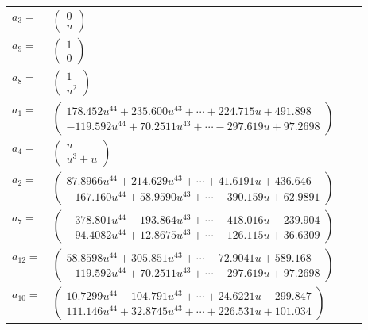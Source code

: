 \documentclass[1p]{elsarticle_modified}
\theoremstyle{definition}
\begin{document}
\begin{tabular}{m{7pt} m{180pt} m{7pt} m{180pt} }
\flushright $a_{3}=$&$\begin{pmatrix}0\\u\end{pmatrix}$ \\
\flushright $a_{9}=$&$\begin{pmatrix}1\\0\end{pmatrix}$ \\
\flushright $a_{8}=$&$\begin{pmatrix}1\\u^2\end{pmatrix}$ \\
\flushright $a_{1}=$&$\begin{pmatrix}178.452 u^{44}+235.600 u^{43}+\cdots+224.715 u+491.898\\-119.592 u^{44}+70.2511 u^{43}+\cdots-297.619 u+97.2698\end{pmatrix}$ \\
\flushright $a_{4}=$&$\begin{pmatrix}u\\u^3+u\end{pmatrix}$ \\
\flushright $a_{2}=$&$\begin{pmatrix}87.8966 u^{44}+214.629 u^{43}+\cdots+41.6191 u+436.646\\-167.160 u^{44}+58.9590 u^{43}+\cdots-390.159 u+62.9891\end{pmatrix}$ \\
\flushright $a_{7}=$&$\begin{pmatrix}-378.801 u^{44}-193.864 u^{43}+\cdots-418.016 u-239.904\\-94.4082 u^{44}+12.8675 u^{43}+\cdots-126.115 u+36.6309\end{pmatrix}$ \\
\flushright $a_{12}=$&$\begin{pmatrix}58.8598 u^{44}+305.851 u^{43}+\cdots-72.9041 u+589.168\\-119.592 u^{44}+70.2511 u^{43}+\cdots-297.619 u+97.2698\end{pmatrix}$ \\
\flushright $a_{10}=$&$\begin{pmatrix}10.7299 u^{44}-104.791 u^{43}+\cdots+24.6221 u-299.847\\111.146 u^{44}+32.8745 u^{43}+\cdots+226.531 u+101.034\end{pmatrix}$ \\

\end{tabular}
\end{document}
